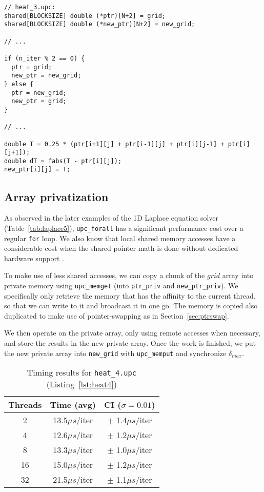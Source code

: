\documentclass[12pt]{article}
\newcommand{\us}[0]{${\mu}s$}
\begin{document}
\begin{lstlisting}[style=C, numbers=none, caption={Excerpt from \texttt{heat\_3.upc}, where pointer-swapping was implemented}, label={lst:heat3}]
// heat_3.upc:
shared[BLOCKSIZE] double (*ptr)[N+2] = grid;
shared[BLOCKSIZE] double (*new_ptr)[N+2] = new_grid;

// ...

if (n_iter % 2 == 0) {
  ptr = grid;
  new_ptr = new_grid;
} else {
  ptr = new_grid;
  new_ptr = grid;
}

// ...

double T = 0.25 * (ptr[i+1][j] + ptr[i-1][j] + ptr[i][j-1] + ptr[i][j+1]);
double dT = fabs(T - ptr[i][j]);
new_ptr[i][j] = T;
\end{lstlisting}

\subsection{Array privatization}

As observed in the later examples of the 1D Laplace equation solver (Table~\ref{tab:laplace5}), \texttt{upc\_forall} has a significant performance cost over a regular \texttt{for} loop.
We also know that local shared memory accesses have a considerable cost when the shared pointer math is done without dedicated hardware support \cite{OlivierSerres:2015}.

To make use of less shared accesses, we can copy a chunk of the $grid$ array into private memory using \texttt{upc\_memget} (into \texttt{ptr\_priv} and \texttt{new\_ptr\_priv}).
We specifically only retrieve the memory that has the affinity to the current thread, so that we can write to it and broadcast it in one go.
The memory is copied also duplicated to make use of pointer-swapping as in Section~\ref{sec:ptrswap}.

We then operate on the private array, only using remote accesses when necessary, and store the results in the new private array.
Once the work is finished, we put the new private array into \texttt{new\_grid} with \texttt{upc\_memput} and synchronize $\delta_{max}$.

\begin{table}[ht]
  \centering\begin{tabular}{|c|c|c|}
    \hline
    Threads & Time (avg) & CI ($\sigma=0.01$) \\
    \hline
    2 & 13.5\us/iter & $\pm$ 1.4\us/iter \\
    4 & 12.6\us/iter & $\pm$ 1.2\us/iter \\
    8 & 13.3\us/iter & $\pm$ 1.0\us/iter \\
    16 & 15.0\us/iter & $\pm$ 1.2\us/iter \\
    32 & 21.5\us/iter & $\pm$ 1.1\us/iter \\
    \hline
  \end{tabular}
  \caption{Timing results for \texttt{heat\_4.upc} (Listing~\ref{lst:heat4})}
  \label{tab:heat4}
\end{table}



\newpage
{}


\end{document}
